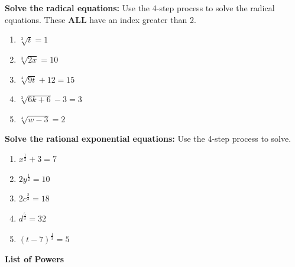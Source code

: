 \documentclass[12pt]{article}
\begin{document}
\hrulefill

\textbf{Solve the radical equations:} Use the 4-step process to solve the radical equations. These \textbf{ALL} have an index greater than 2.\\

\begin{enumerate}[resume]

	\item $\sqrt[3]{t}=1$\\
	
	
	\item $\sqrt[3]{2x}=10$\\
	
	
	\item $\sqrt[4]{9t}+12=15$\\
	
	
	\item $\sqrt[3]{6k+6}-3=3$\\
	
	
	\item $\sqrt[4]{w-3}=2$\\

\end{enumerate}

\pagebreak

\textbf{Solve the rational exponential equations:} Use the 4-step process to solve.\\

\begin{enumerate}[resume]

	\item $x^{\frac{1}{2}}+3=7$\\
	
	\item $2y^{\frac{1}{2}}=10$\\
	
	\item $2c^{\frac{2}{3}}=18$\\
	
	\item $d^{\frac{5}{3}}=32$\\
	
	\item $(t-7)^{\frac{1}{3}}=5$\\


\end{enumerate}

\hrulefill

\textbf{List of Powers}\\
\end{document}
